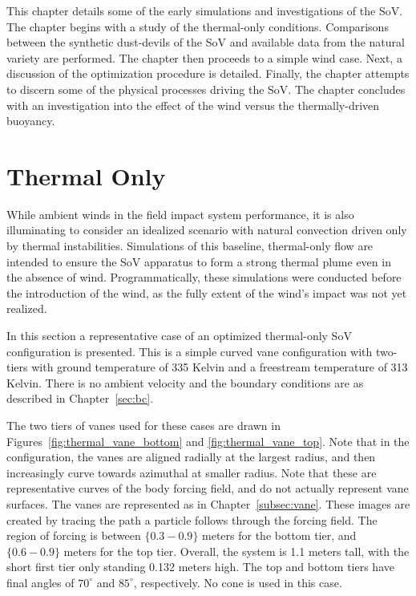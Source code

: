 \label{sec:results}

%
%
%
%

This chapter details some of the early simulations and investigations
of the SoV. The chapter begins with a study of the thermal-only
conditions. Comparisons between the synthetic dust-devils of the SoV and
available data from the natural variety are performed. The chapter then
proceeds to a simple wind case. Next, a discussion of the optimization
procedure is detailed. Finally, the chapter attempts to discern some of
the physical processes driving the SoV. The chapter concludes with an
investigation into the effect of the wind versus the thermally-driven buoyancy. 

\section{Thermal Only}
\label{sec:thermal_only}

While ambient winds in the field impact system performance, it is
also illuminating to consider an idealized scenario with natural
convection driven only by thermal instabilities. Simulations of this
baseline, thermal-only flow are intended to ensure the SoV apparatus to
form a strong thermal plume even in the absence of
wind. Programmatically, these simulations were conducted before the
introduction of the wind, as the fully extent of the wind's impact was
not yet realized. 

In this section a representative case of an optimized thermal-only SoV
configuration is presented. This is a simple curved vane configuration with
two-tiers with ground temperature of 335 Kelvin and a freestream
temperature of 313 Kelvin. There is no ambient velocity and the boundary
conditions are as described in Chapter~\ref{sec:bc}.  

The two tiers of vanes used for these cases are drawn in
Figures~\ref{fig:thermal_vane_bottom} and \ref{fig:thermal_vane_top}.  
Note that in the configuration, the vanes are aligned radially at the
largest radius, and then increasingly curve towards azimuthal at smaller
radius. Note that these are representative curves of the body forcing
field, and do not actually represent vane surfaces. The vanes are
represented as in Chapter~\ref{subsec:vane}. These images are created
by tracing the path a particle follows through the forcing field. The
region of forcing is between $\{0.3-0.9\}$ meters for the bottom tier,
and $\{0.6-0.9\}$ meters for the top tier. Overall, the system is 1.1
meters tall, with the short first tier only standing 0.132 meters
high. The top and bottom tiers have final angles of $70^{\circ}$ and
$85^{\circ}$, respectively. No cone is used in this case. 

